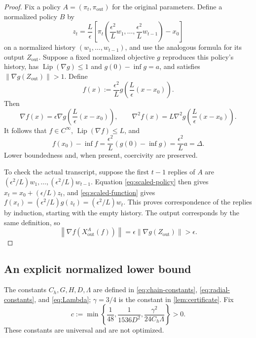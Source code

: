 \documentclass[11pt]{article}
\numberwithin{equation}{section}
\theoremstyle{definition}
\theoremstyle{remark}
\newcommand{\norm}[1]{\left\lVert #1\right\rVert}
\newcommand{\Lip}{\operatorname{Lip}}
\begin{document}
\begin{proof}
Fix a policy $A=(\pi_t,\pi_{\mathrm{out}})$ for the original parameters.
Define a normalized policy $B$ by
\begin{equation}
    z_t=\frac L\epsilon\left[
       \pi_t\left(\frac{\epsilon^2}{L}w_1,\ldots,
                  \frac{\epsilon^2}{L}w_{t-1}\right)-x_0\right]
    \label{eq:scaled-policy}
\end{equation}
on a normalized history $(w_1,\ldots,w_{t-1})$, and use the analogous
formula for its output $Z_{\mathrm{out}}$.
Suppose a fixed normalized objective $g$ reproduces this policy's history,
has $\Lip(\nabla g)\leq1$ and $g(0)-\inf g=a$, and satisfies
$\norm{\nabla g(Z_{\mathrm{out}})}>1$.
Define
\begin{equation}
    f(x):=\frac{\epsilon^2}{L}
             g\!\left(\frac L\epsilon(x-x_0)\right).
    \label{eq:scaled-function}
\end{equation}
Then
\begin{equation}
    \nabla f(x)=\epsilon\nabla g\!\left(\frac L\epsilon(x-x_0)\right),
    \qquad
    \nabla^2 f(x)=L\nabla^2g\!\left(\frac L\epsilon(x-x_0)\right).
    \label{eq:scaled-derivatives}
\end{equation}
It follows that $f\in C^\infty$, $\Lip(\nabla f)\leq L$, and
\[
    f(x_0)-\inf f=\frac{\epsilon^2}{L}(g(0)-\inf g)
                =\frac{\epsilon^2}{L}a=\Delta.
\]
Lower boundedness and, when present, coercivity are preserved.

To check the actual transcript, suppose the first $t-1$ replies of $A$
are $(\epsilon^2/L)w_1,\ldots,(\epsilon^2/L)w_{t-1}$.
Equation \eqref{eq:scaled-policy} then gives
$x_t=x_0+(\epsilon/L)z_t$, and \eqref{eq:scaled-function} gives
$f(x_t)=(\epsilon^2/L)g(z_t)=(\epsilon^2/L)w_t$.
This proves correspondence of the replies by induction, starting with the
empty history. The output corresponds by the same definition, so
\[
    \norm{\nabla f(X_{\mathrm{out}}^A(f))}
    =\epsilon\norm{\nabla g(Z_{\mathrm{out}})}>\epsilon.
\]
\end{proof}

\subsection{An explicit normalized lower bound}

The constants $C_h,G,H,D,\Lambda$ are defined in
\eqref{eq:chain-constants}, \eqref{eq:radial-constants}, and
\eqref{eq:Lambda}; $\gamma=3/4$ is the constant in
\cref{lem:certificate}. Fix
\begin{equation}
    c:=\min\left\{\frac1{48},\frac1{1536D^2},
                      \frac{\gamma^2}{24C_h\Lambda}\right\}>0.
    \label{eq:c}
\end{equation}
These constants are universal and are not optimized.
\end{document}
